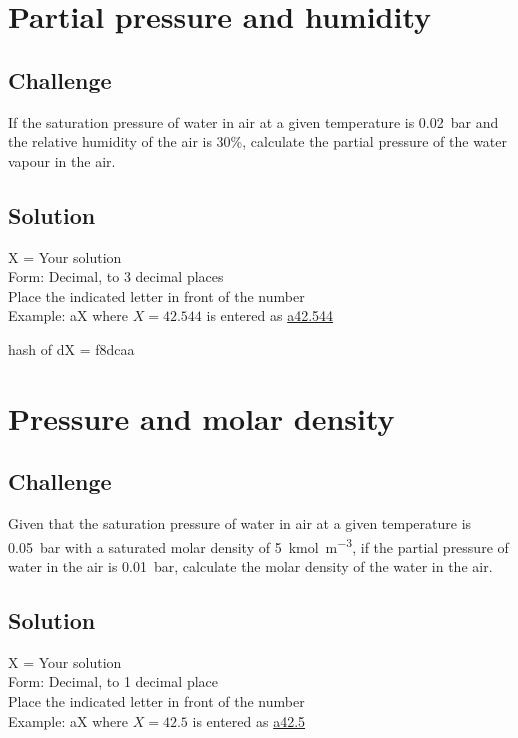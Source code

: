 \newpage
\section{Partial pressure and humidity}

\subsection*{Challenge}
If the saturation pressure of water in air at a given temperature is \SI{0.02}{\bar} and the relative humidity of the air is 30\%, calculate the partial pressure of the water vapour in the air.

\subsection*{Solution}
X = Your solution\\
Form: Decimal, to 3 decimal places\\
Place the indicated letter in front of the number\\
Example: aX where $X=42.544$ is entered as \href{http://www.wolframalpha.com/input/?i=md5+hash+of+\%22a42.544\%22}{a42.544}

hash of dX = f8dcaa



\newpage
\section{Pressure and molar density}

\subsection*{Challenge}
Given that the saturation pressure of water in air at a given temperature is \SI{0.05}{\bar} with a saturated molar density of \SI{5}{\kmol\per\cubic\meter}, if the partial pressure of water in the air is \SI{0.01}{\bar}, calculate the molar density of the water in the air.

\subsection*{Solution}
X = Your solution\\
Form: Decimal, to 1 decimal place\\
Place the indicated letter in front of the number\\
Example: aX where $X=42.5$ is entered as \href{http://www.wolframalpha.com/input/?i=md5+hash+of+\%22a42.544\%22}{a42.5}

